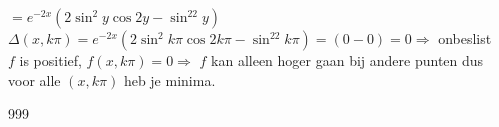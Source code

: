 \documentclass[a4paper]{article}
\begin{document}
$= e^{-2x}\left(2\sin^2y\cos 2y - \sin^22y\right)$ \\

$\Delta(x, k\pi) = e^{-2x}\left(2\sin^2k\pi\cos 2k\pi - \sin^22k\pi\right) = (0 - 0) = 0 \Rightarrow$ onbeslist \\

$f$ is positief, $f(x, k\pi) = 0 \Rightarrow$ $f$ kan alleen hoger gaan bij andere punten dus voor alle $(x, k\pi)$ heb je minima. \\




\begin{thebibliography}{999}
\end{thebibliography}
\end{document}
